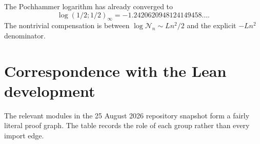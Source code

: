 \documentclass[11pt,oneside]{article}
\theoremstyle{definition}
\theoremstyle{remark}
\begin{document}
The Pochhammer logarithm has already converged to
\begin{equation}
 \log(1/2;1/2)_\infty=-1.2420620948124149458\ldots.         \label{dyadicasym:eq:qpoch-numeric}
\end{equation}
The nontrivial compensation is between $\log\mathcal N_n\sim Ln^2/2$ and the explicit
$-Ln^2$ denominator.

\section{Correspondence with the Lean development}
\label{dyadicasym:sec:lean-map}

The relevant modules in the 25 August 2026 repository snapshot \cite{dyadicasym:proveit2026}
form a fairly literal proof graph.  The table records the role of each group rather than every import edge.
\end{document}

